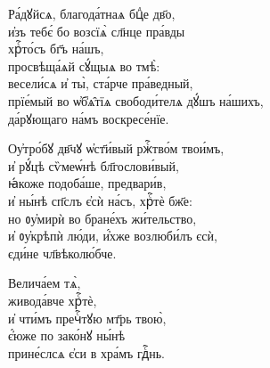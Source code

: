 \documentclass{article}
\begin{document}
%
Ра́дꙋйсѧ, благода́тнаѧ бцⷣе дв҃о,\\
и҆зъ тебє́ бо возсїѧ̀ сл҃нце пра́вды \\
   \cont хрⷭ҇то́съ бг҃ъ на́шъ,\\
просвѣща́ѧй сꙋ́щыѧ во тмѣ̀:\\
весели́сѧ и҆ ты̀, ста́рче пра́ведный,\\
прїе́мый во ѡ҆б̾ѧ̑тїѧ свободи́телѧ дꙋ́шъ на́шихъ,\\
да́рꙋющаго на́мъ воскресе́нїе. 

Оу҆тро́бꙋ дв҃чꙋ ѡ҆ст҃и́вый ржⷭ҇тво́м твои́мъ,\\
и҆ рꙋ́цѣ сѷмеѡ́нѣ бл҃гослови́вый,\\
ꙗ́коже подоба́ше, предвари́в,\\
и҆ ны́нѣ сп҃слъ є҆сѝ на́съ, хрⷭ҇тѐ бж҃е:\\
но ᲂу҆мирѝ во бране́хъ жи́тельство,\\
и҆ ᲂу҆крѣпѝ лю́ди, и҆́хже возлюби́лъ єсѝ,\\
    \cont єди́не чл҃вѣколю́бче.

Велича́ем тѧ̀,\\
живода́вче хрⷭ҇тѐ,\\
и҆ чти́мъ пречⷭ҇тꙋю мт҃рь твою̀,\\
є҆́юже по зако́нꙋ ны́нѣ\\
прине́слсѧ є҆си в хра́мъ гдⷭ҇нь.
\end{document}
